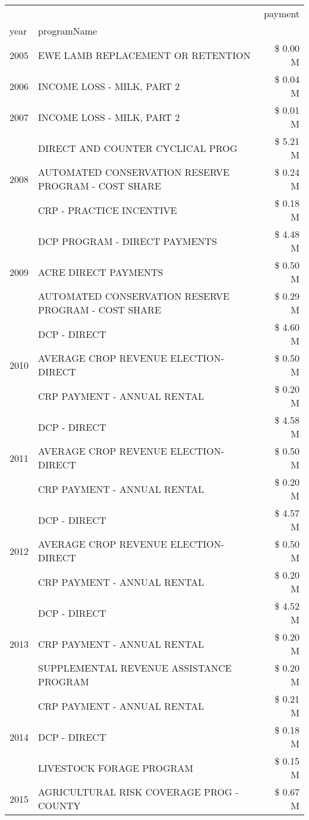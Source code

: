 \begin{tabular}{llr}
\toprule
 &  & payment \\
year & programName &  \\
\midrule
2005 & EWE LAMB REPLACEMENT OR RETENTION & \$ 0.00 M \\
\cline{1-3}
2006 & INCOME LOSS - MILK, PART 2 & \$ 0.04 M \\
\cline{1-3}
2007 & INCOME LOSS - MILK, PART 2 & \$ 0.01 M \\
\cline{1-3}
\multirow[t]{3}{*}{2008} & DIRECT AND COUNTER CYCLICAL PROG & \$ 5.21 M \\
 & AUTOMATED CONSERVATION RESERVE PROGRAM - COST SHARE & \$ 0.24 M \\
 & CRP - PRACTICE INCENTIVE & \$ 0.18 M \\
\cline{1-3}
\multirow[t]{3}{*}{2009} & DCP PROGRAM - DIRECT PAYMENTS & \$ 4.48 M \\
 & ACRE DIRECT PAYMENTS & \$ 0.50 M \\
 & AUTOMATED CONSERVATION RESERVE PROGRAM - COST SHARE & \$ 0.29 M \\
\cline{1-3}
\multirow[t]{3}{*}{2010} & DCP - DIRECT & \$ 4.60 M \\
 & AVERAGE CROP REVENUE ELECTION-DIRECT & \$ 0.50 M \\
 & CRP PAYMENT - ANNUAL RENTAL & \$ 0.20 M \\
\cline{1-3}
\multirow[t]{3}{*}{2011} & DCP - DIRECT & \$ 4.58 M \\
 & AVERAGE CROP REVENUE ELECTION-DIRECT & \$ 0.50 M \\
 & CRP PAYMENT - ANNUAL RENTAL & \$ 0.20 M \\
\cline{1-3}
\multirow[t]{3}{*}{2012} & DCP - DIRECT & \$ 4.57 M \\
 & AVERAGE CROP REVENUE ELECTION-DIRECT & \$ 0.50 M \\
 & CRP PAYMENT - ANNUAL RENTAL & \$ 0.20 M \\
\cline{1-3}
\multirow[t]{3}{*}{2013} & DCP - DIRECT & \$ 4.52 M \\
 & CRP PAYMENT - ANNUAL RENTAL & \$ 0.20 M \\
 & SUPPLEMENTAL REVENUE ASSISTANCE PROGRAM & \$ 0.20 M \\
\cline{1-3}
\multirow[t]{3}{*}{2014} & CRP PAYMENT - ANNUAL RENTAL & \$ 0.21 M \\
 & DCP - DIRECT & \$ 0.18 M \\
 & LIVESTOCK FORAGE PROGRAM & \$ 0.15 M \\
\cline{1-3}
\multirow[t]{3}{*}{2015} & AGRICULTURAL RISK COVERAGE PROG - COUNTY & \$ 0.67 M \\

\end{tabular}
